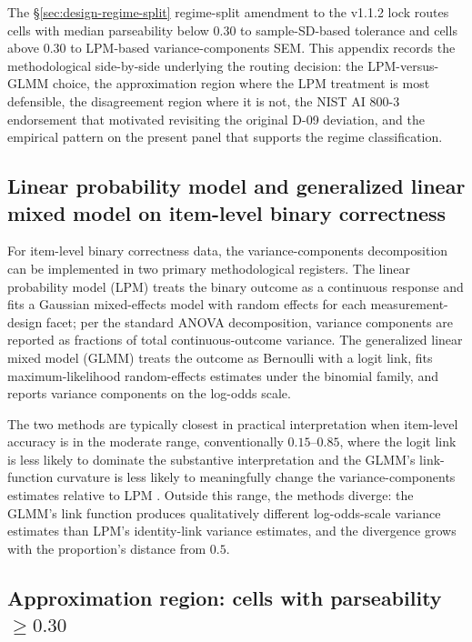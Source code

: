 \documentclass[11pt]{article}
\begin{document}
The §\ref{sec:design-regime-split} regime-split amendment to the v1.1.2 lock routes cells with median parseability below 0.30 to sample-SD-based tolerance and cells above 0.30 to LPM-based variance-components SEM. This appendix records the methodological side-by-side underlying the routing decision: the LPM-versus-GLMM choice, the approximation region where the LPM treatment is most defensible, the disagreement region where it is not, the NIST AI 800-3 endorsement that motivated revisiting the original D-09 deviation, and the empirical pattern on the present panel that supports the regime classification.

\subsection{Linear probability model and generalized linear mixed model on item-level binary correctness}
\label{app:lpm-glmm-background}

For item-level binary correctness data, the variance-components decomposition can be implemented in two primary methodological registers. The linear probability model (LPM) treats the binary outcome as a continuous response and fits a Gaussian mixed-effects model with random effects for each measurement-design facet; per the standard ANOVA decomposition, variance components are reported as fractions of total continuous-outcome variance. The generalized linear mixed model (GLMM) treats the outcome as Bernoulli with a logit link, fits maximum-likelihood random-effects estimates under the binomial family, and reports variance components on the log-odds scale.

The two methods are typically closest in practical interpretation when item-level accuracy is in the moderate range, conventionally $0.15$--$0.85$, where the logit link is less likely to dominate the substantive interpretation and the GLMM's link-function curvature is less likely to meaningfully change the variance-components estimates relative to LPM \citep{hellevik2009linear}. Outside this range, the methods diverge: the GLMM's link function produces qualitatively different log-odds-scale variance estimates than LPM's identity-link variance estimates, and the divergence grows with the proportion's distance from $0.5$.

\subsection{Approximation region: cells with parseability $\geq 0.30$}
\label{app:lpm-glmm-agreement}
\end{document}
